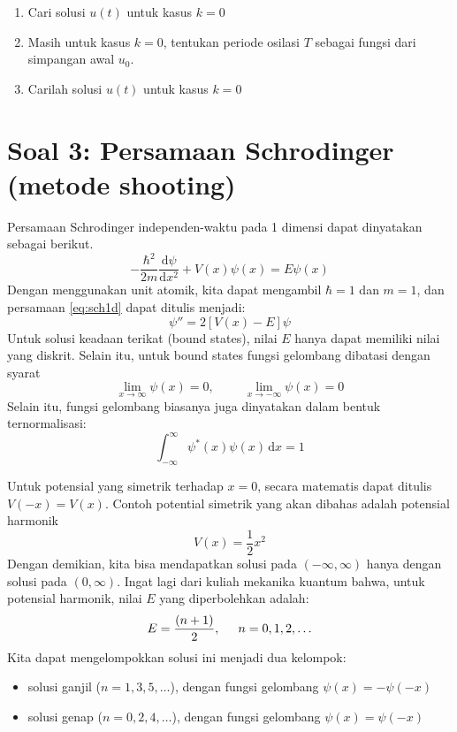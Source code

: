 \documentclass[12pt]{article}
\begin{document}
\begin{enumerate}[label=(\alph*)]
\item Cari solusi $u(t)$ untuk kasus $k=0$
\item Masih untuk kasus $k=0$, tentukan periode osilasi $T$ sebagai
fungsi dari simpangan awal $u_0$.
\item Carilah solusi $u(t)$ untuk kasus $k=0$
\end{enumerate}


\section{Soal 3: Persamaan Schrodinger (metode shooting)}

Persamaan Schrodinger independen-waktu pada 1 dimensi
dapat dinyatakan sebagai berikut.
\begin{equation}
-\frac{\hbar^2}{2m}\frac{\mathrm{d}\psi}{\mathrm{d}x^2}
+ V(x)\psi(x) = E\psi(x)
\label{eq:sch1d}
\end{equation}
Dengan menggunakan unit atomik, kita dapat mengambil $\hbar = 1$
dan $m = 1$, dan persamaan \eqref{eq:sch1d} dapat ditulis menjadi:
\begin{equation}
\psi'' = 2\left[ V(x) - E \right]\psi
\label{eq:sch1d_2}
\end{equation}
Untuk solusi keadaan terikat (bound states), nilai $E$ hanya dapat memiliki
nilai yang diskrit. Selain itu, untuk bound states
fungsi gelombang dibatasi dengan syarat
\begin{equation}
\lim_{x\rightarrow\infty} \psi(x) = 0,\hspace{1cm}\lim_{x\rightarrow-\infty} \psi(x) = 0
\end{equation}
Selain itu, fungsi gelombang biasanya juga dinyatakan dalam bentuk ternormalisasi:
\begin{equation}
\int_{-\infty}^{\infty} \psi^{*}(x) \psi(x)\,\mathrm{d}x = 1
\end{equation}

Untuk potensial yang simetrik terhadap $x=0$, secara matematis dapat ditulis
$V(-x) = V(x)$. Contoh potential simetrik yang akan dibahas adalah potensial harmonik
\begin{equation}
V(x) = \frac{1}{2}x^2
\end{equation}
Dengan demikian, kita bisa mendapatkan solusi pada $(-\infty,\infty)$ hanya dengan
solusi pada $(0,\infty)$.
Ingat lagi dari kuliah mekanika kuantum bahwa,
untuk potensial harmonik, nilai $E$ yang diperbolehkan adalah:
\begin{equation}
E = \frac{(n + 1)}{2}, \hspace{0.5cm} n = 0,1,2,\ldots
\end{equation}
Kita dapat mengelompokkan solusi ini menjadi dua kelompok:
\begin{itemize}
\item solusi ganjil ($n = 1, 3, 5, \ldots$), dengan fungsi gelombang
$\psi(x) = -\psi(-x)$
\item solusi genap ($n = 0, 2, 4, \ldots$), dengan fungsi gelombang
$\psi(x) = \psi(-x)$
\end{itemize}
\end{document}
